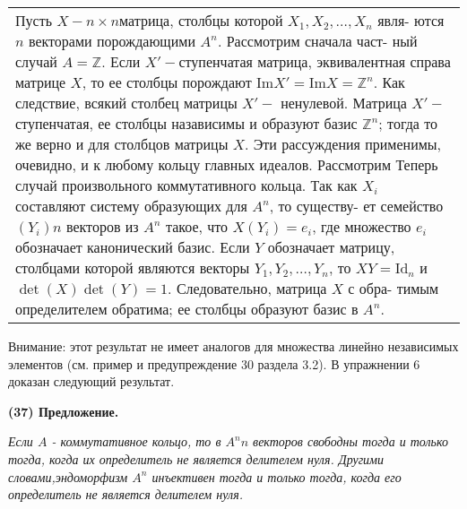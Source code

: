 	\begin{tabular}{|p{12.5cm}}
	\noindent
	Пусть $X - n\times n$матрица, столбцы которой $X_1, X_2, \ldots, X_n$ явля-\linebreak
	ются $n$ векторами порождающими $A^n$. Рассмотрим сначала част-\linebreak
	ный случай $A = \mathbb Z$. Если $X' - $ступенчатая матрица, эквивалентная\linebreak
	справа матрице $X$, то ее столбцы порождают Im$X' = $Im$X = \mathbb Z^n$.\linebreak
	Как следствие, всякий столбец матрицы $X' -$ ненулевой. Матрица\linebreak
	$X' -$ ступенчатая, ее столбцы назависимы и образуют базис $\mathbb Z^n$;\linebreak
	тогда то же верно и для столбцов матрицы $X$. Эти рассуждения\linebreak
	применимы, очевидно, и к любому кольцу главных идеалов.\linebreak
	Рассмотрим Теперь случай произвольного коммутативного кольца.\linebreak
	Так как $X_i$ составляют систему образующих для $A^n$, то существу-\linebreak
	ет семейство $(Y_i) n$ векторов из $A^n$ такое, что $X(Y_i) = e_i$, где\linebreak
	множество $e_i$ обозначает канонический базис. Если $Y$ обозначает\linebreak
	матрицу, столбцами которой являются векторы $Y_1, Y_2, \ldots, Y_n$, то\linebreak
	$XY = \text{Id}_n$ и $\det(X)\det(Y) = 1$. Следовательно, матрица $X$ с обра-\linebreak
	тимым определителем обратима; ее столбцы образуют базис в $A^n$.
	\end{tabular}
	
	Внимание: этот результат не имеет аналогов для множества линейно\linebreak
	независимых элементов (см. пример и предупреждение 30 раздела 3.2).\linebreak
	В упражнении 6 доказан следующий результат.
	
	\noindent
	{\bf (37) Предложение.}
	
	{\it Если $A$ - коммутативное кольцо, то в $A^n n$ векторов свободны\linebreak
	тогда и только тогда, когда их определитель не является делителем\linebreak
	нуля. Другими словами,эндоморфизм $A^n$ инъективен тогда и только\linebreak
	тогда, когда его определитель не является делителем нуля.}
	
